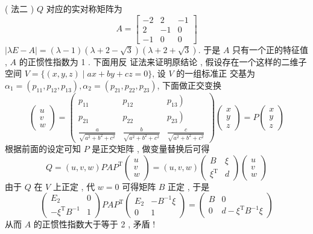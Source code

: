 \documentclass[10pt]{article}
\begin{document}
( 法二 ) $Q$  对应的实对称矩阵为 
$$
A=\left[\begin{array}{rrr}
-2 & 2 & -1 \\
2 & -1 & 0 \\
-1 & 0 & 0
\end{array}\right]
$$
$|\lambda E-A|=(\lambda-1)(\lambda+2-\sqrt{3})(\lambda+2+\sqrt{3})$.  于是  $A$  只有一个正的特征值 , $A$  的正惯性指数为  1 .  下面用反   证法来证明原结论 ,  假设存在一个这样的二维子空间  $V=\{(x, y, z) \mid a x+b y+c z=0\}$,  设  $V$  的一组标准正   交基为  $\alpha_{1}=\left(p_{11}, p_{12}, p_{13}\right), \alpha_{2}=\left(p_{21}, p_{22}, p_{23}\right)$,  下面做正交变换 
$$
\left(\begin{array}{l}
u \\
v \\
w
\end{array}\right)=\left(\begin{array}{ccc}
p_{11} & p_{12} & \left.p_{13}\right) \\
p_{21} & p_{22} & \left.p_{23}\right) \\
\frac{a}{\sqrt{a^{2}+b^{2}+c^{2}}} & \frac{b}{\sqrt{a^{2}+b^{2}+c^{2}}} & \frac{c}{\sqrt{a^{2}+b^{2}+c^{2}}}
\end{array}\right)\left(\begin{array}{l}
x \\
y \\
z
\end{array}\right)=P\left(\begin{array}{l}
x \\
y \\
z
\end{array}\right)
$$
 根据前面的设定可知  $P$  是正交矩阵 ,  做变量替换后可得 
$$
Q=(u, v, w) P A P^{\mathrm{T}}\left(\begin{array}{c}
u \\
v \\
w
\end{array}\right)=(u, v, w)\left(\begin{array}{cc}
B & \xi \\
\xi^{\mathrm{T}} & d
\end{array}\right)\left(\begin{array}{l}
u \\
v \\
w
\end{array}\right)
$$
 由于  $Q$  在  $V$  上正定 ,  代  $w=0$  可得矩阵  $B$  正定 ,  于是 
$$
\left(\begin{array}{cc}
E_{2} & 0 \\
-\xi^{\mathrm{T}} B^{-1} & 1
\end{array}\right) P A P^{\mathrm{T}}\left(\begin{array}{cc}
E_{2} & -B^{-1} \xi \\
0 & 1
\end{array}\right)=\left(\begin{array}{cc}
B & 0 \\
0 & d-\xi^{\mathrm{T}} B^{-1} \xi
\end{array}\right)
$$
 从而  $A$  的正惯性指数大于等于  2 ,  矛盾 !
\end{document}
